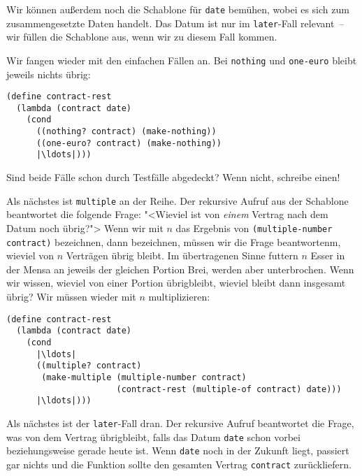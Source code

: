 %
Wir können außerdem noch die Schablone für \lstinline{date} bemühen,
wobei es sich zum zusammengesetzte Daten handelt.  Das Datum ist nur
im \lstinline{later}-Fall relevant~-- wir füllen die Schablone aus,
wenn wir zu diesem Fall kommen.

Wir fangen wieder mit den einfachen Fällen an.  Bei
\lstinline{nothing} und \lstinline{one-euro} bleibt jeweils nichts
übrig:
%
\begin{lstlisting}
(define contract-rest
  (lambda (contract date)
    (cond
      ((nothing? contract) (make-nothing))
      ((one-euro? contract) (make-nothing))
      |\ldots|)))
\end{lstlisting}
%
\begin{aufgabe}
  Sind beide Fälle schon durch Testfälle abgedeckt?  Wenn nicht,
  schreibe einen!
\end{aufgabe}
%
Als nächstes ist \lstinline{multiple} an der Reihe.  Der rekursive
Aufruf aus der Schablone beantwortet die folgende Frage: "<Wieviel ist
von \emph{einem} Vertrag nach dem Datum noch übrig?"> Wenn wir mit $n$
das Ergebnis von \lstinline{(multiple-number contract)} bezeichnen,
dann bezeichnen, müssen wir die Frage beantwortenm, wieviel von $n$
Verträgen übrig bleibt.  Im übertragenen Sinne futtern $n$ Esser in
der Mensa an jeweils der gleichen Portion Brei, werden aber
unterbrochen. Wenn wir wissen, wieviel von einer Portion übrigbleibt,
wieviel bleibt dann insgesamt übrig?  Wir müssen wieder mit $n$
multiplizieren:
%
\begin{lstlisting}
(define contract-rest
  (lambda (contract date)
    (cond
      |\ldots|
      ((multiple? contract)
       (make-multiple (multiple-number contract)
                      (contract-rest (multiple-of contract) date)))
      |\ldots|)))
\end{lstlisting}
%
Als nächstes ist der \lstinline{later}-Fall dran.  Der rekursive
Aufruf beantwortet die Frage, was von dem Vertrag übrigbleibt, falls
das Datum \lstinline{date} schon vorbei beziehungsweise gerade heute
ist.  Wenn \lstinline{date} noch in der Zukunft liegt, passiert gar
nichts und die Funktion sollte den gesamten Vertrag
\lstinline{contract} zurückliefern.

